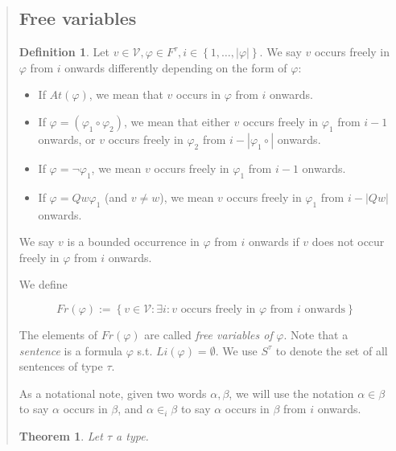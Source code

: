 \documentclass[a4paper, 12pt]{article}
\newtheorem{theorem}{Theorem}
\theoremstyle{definition}
\theoremstyle{definition}
\theoremstyle{definition}
\newtheorem{definition}{Definition}
\begin{document}
\begin{quote}
\subsection{Free variables}

\begin{definition}
    Let $v \in \mathcal{V}, \varphi \in F^\tau, i \in \left\{ 1, \ldots,
    |\varphi| \right\} $. We say $v$ occurs freely in $\varphi$ from $i$
    onwards differently depending on the form of $\varphi$:

    \begin{itemize}
        \item If $At(\varphi)$, we mean that $v$ occurs in $\varphi$ from $i$ onwards. 
        \item If $\varphi = (\varphi_1 \circ \varphi_2)$, we mean that either $v$ occurs freely 
            in $\varphi_1$ from $i - 1$ onwards, or $v$ occurs freely 
            in $\varphi_2$ from $i - | \varphi_1 \circ|$ onwards. 
        \item If $\varphi = \neg \varphi_1$, we mean $v$ occurs freely 
            in $\varphi_1$ from $i - 1$ onwards. 
        \item If $\varphi = Q w \varphi_1$ (and $v \neq w$), we mean $v$ occurs
            freely in $\varphi_1$ from $i - |Qw|$ onwards. 
    \end{itemize}

    We say $v$ is a bounded occurrence in $\varphi$ from $i$ onwards if $v$ does not 
    occur freely in $\varphi$ from $i$ onwards.
\end{definition}

We define 

\begin{equation*}
    Fr(\varphi) := \left\{ v \in \mathcal{V} : \exists i : v \text{ occurs freely in } \varphi \text{ from $i$ onwards} \right\} 
\end{equation*}

The elements of $Fr(\varphi)$ are called \textit{free variables of} $\varphi$.
Note that a \textit{sentence} is a formula $\varphi$ s.t. $Li(\varphi) =
\emptyset$. We use $S^\tau$ to denote the set of all sentences of type $\tau$.

As a notational note, given two words $\alpha, \beta$, we will use the notation
$\alpha \in \beta$ to say $\alpha$ occurs in $\beta$, and $\alpha \in_i \beta$
to say $\alpha$ occurs in $\beta$ from $i$ onwards.

\begin{theorem}
    Let $\tau$ a type. 


\end{theorem}
\end{quote}
\end{document}
